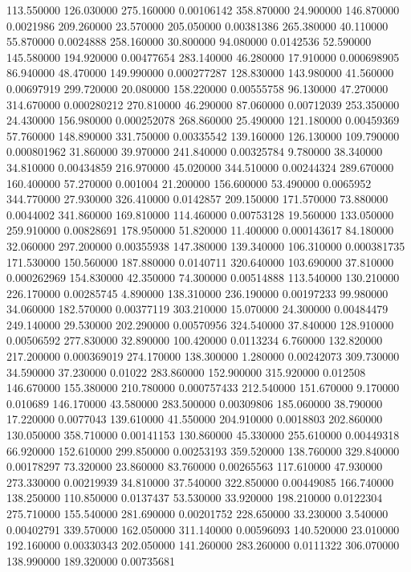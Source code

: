 113.550000	126.030000	275.160000	0.00106142
358.870000	24.900000	146.870000	0.0021986
209.260000	23.570000	205.050000	0.00381386
265.380000	40.110000	55.870000	0.0024888
258.160000	30.800000	94.080000	0.0142536
52.590000	145.580000	194.920000	0.00477654
283.140000	46.280000	17.910000	0.000698905
86.940000	48.470000	149.990000	0.000277287
128.830000	143.980000	41.560000	0.00697919
299.720000	20.080000	158.220000	0.00555758
96.130000	47.270000	314.670000	0.000280212
270.810000	46.290000	87.060000	0.00712039
253.350000	24.430000	156.980000	0.000252078
268.860000	25.490000	121.180000	0.00459369
57.760000	148.890000	331.750000	0.00335542
139.160000	126.130000	109.790000	0.000801962
31.860000	39.970000	241.840000	0.00325784
9.780000	38.340000	34.810000	0.00434859
216.970000	45.020000	344.510000	0.00244324
289.670000	160.400000	57.270000	0.001004
21.200000	156.600000	53.490000	0.0065952
344.770000	27.930000	326.410000	0.0142857
209.150000	171.570000	73.880000	0.0044002
341.860000	169.810000	114.460000	0.00753128
19.560000	133.050000	259.910000	0.00828691
178.950000	51.820000	11.400000	0.000143617
84.180000	32.060000	297.200000	0.00355938
147.380000	139.340000	106.310000	0.000381735
171.530000	150.560000	187.880000	0.0140711
320.640000	103.690000	37.810000	0.000262969
154.830000	42.350000	74.300000	0.00514888
113.540000	130.210000	226.170000	0.00285745
4.890000	138.310000	236.190000	0.00197233
99.980000	34.060000	182.570000	0.00377119
303.210000	15.070000	24.300000	0.00484479
249.140000	29.530000	202.290000	0.00570956
324.540000	37.840000	128.910000	0.00506592
277.830000	32.890000	100.420000	0.0113234
6.760000	132.820000	217.200000	0.000369019
274.170000	138.300000	1.280000	0.00242073
309.730000	34.590000	37.230000	0.01022
283.860000	152.900000	315.920000	0.012508
146.670000	155.380000	210.780000	0.000757433
212.540000	151.670000	9.170000	0.010689
146.170000	43.580000	283.500000	0.00309806
185.060000	38.790000	17.220000	0.0077043
139.610000	41.550000	204.910000	0.0018803
202.860000	130.050000	358.710000	0.00141153
130.860000	45.330000	255.610000	0.00449318
66.920000	152.610000	299.850000	0.00253193
359.520000	138.760000	329.840000	0.00178297
73.320000	23.860000	83.760000	0.00265563
117.610000	47.930000	273.330000	0.00219939
34.810000	37.540000	322.850000	0.00449085
166.740000	138.250000	110.850000	0.0137437
53.530000	33.920000	198.210000	0.0122304
275.710000	155.540000	281.690000	0.00201752
228.650000	33.230000	3.540000	0.00402791
339.570000	162.050000	311.140000	0.00596093
140.520000	23.010000	192.160000	0.00330343
202.050000	141.260000	283.260000	0.0111322
306.070000	138.990000	189.320000	0.00735681
